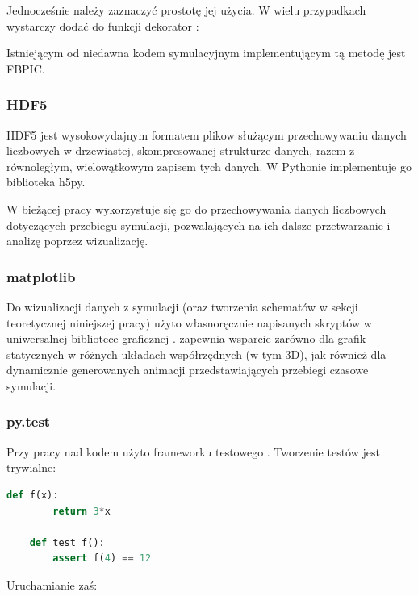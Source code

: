     Jednocześnie należy zaznaczyć prostotę jej użycia. W wielu przypadkach wystarczy
    dodać do funkcji dekorator :




    Istniejącym od niedawna kodem symulacyjnym implementującym tą metodę jest FBPIC\cite{fbpic}.


    \subsubsection{HDF5}
    HDF5 jest wysokowydajnym formatem plikow służącym przechowywaniu danych
    liczbowych w drzewiastej, skompresowanej strukturze danych, razem z
    równoległym, wielowątkowym zapisem tych danych.  W Pythonie implementuje go
    biblioteka h5py\cite{h5py}.

    W bieżącej pracy wykorzystuje się go do przechowywania danych liczbowych
    dotyczących przebiegu symulacji, pozwalających na ich dalsze przetwarzanie
    i analizę poprzez wizualizację.

    \subsubsection{matplotlib}
    Do wizualizacji danych z symulacji (oraz tworzenia schematów w sekcji
    teoretycznej niniejszej pracy) użyto własnoręcznie napisanych skryptów w
    uniwersalnej bibliotece graficznej \cite{matplotlib}.
     zapewnia wsparcie zarówno dla grafik statycznych w różnych układach
    współrzędnych (w tym 3D), jak również dla dynamicznie generowanych animacji
    przedstawiających przebiegi czasowe symulacji.

    \subsubsection{py.test}
    Przy pracy nad kodem użyto frameworku testowego  \cite{pytest}.
    Tworzenie testów jest trywialne:

    \begin{lstlisting}[language=Python, caption=Podstawowy przykład testu w pliku \code{func.py}]
    def f(x):
        return 3*x

    def test_f():
        assert f(4) == 12
    \end{lstlisting}

    Uruchamianie zaś:

